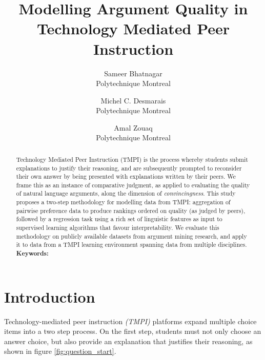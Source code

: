 \documentclass[notitlepage,12pt]{jedm}
\begin{document}
	
	\title{Modelling Argument Quality in Technology Mediated Peer Instruction}
	\date{} %
	
	\author{
		{\large Sameer Bhatnagar}
		\\Polytechnique Montreal
	 	\and 
	 	{\large Michel C. Desmarais}
	 	\\Polytechnique Montreal
	 	\and 
	 	{\large Amal Zouaq}
 		\\Polytechnique Montreal
 }

	
	\maketitle
	
	\begin{abstract}
		Technology Mediated Peer Instruction (TMPI) is the process whereby 
		students submit explanations to justify their reasoning, and are 
		subsequently prompted to reconsider their own answer by being presented 
		with explanations written by their peers. 
		We frame this as an instance of comparative judgment, as applied to 
		evaluating the quality of natural language arguments, along the 
		dimension of \textit{convincingness}.
		This study proposes a two-step methodology for modelling data from 
		TMPI: aggregation of pairwise preference data to produce rankings 
		ordered on quality (as judged by peers), followed by a regression task 
		using a rich set of linguistic features as input to supervised learning 
		algorithms that favour interpretability. 
		We evaluate this methodology on publicly available datasets from 
		argument mining research, and apply it to data from a TMPI learning 
		environment spanning data from multiple disciplines.		
		\\ %
		{\parindent0pt
			\textbf{Keywords:} 
		}
	\end{abstract}

\section{Introduction}
Technology-mediated peer instruction \textit{(TMPI)} platforms 
\cite{charles_harnessing_2019}\cite{univeristy_of_british_columbia_ubc/ubcpi_2019}
expand multiple choice items into a two step process.
On the first step, students must not only choose an answer choice, but also 
provide an explanation that justifies their reasoning, as shown in figure 
\ref{fig:question_start}.
\end{document}
